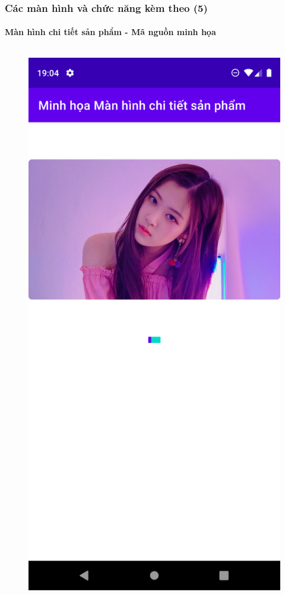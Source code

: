 \documentclass{beamer}
\begin{document}
\begin{frame}
    \frametitle{Các màn hình và chức năng kèm theo (5)}
    \framesubtitle{Màn hình chi tiết sản phẩm - Mã nguồn minh họa}

    \begin{columns}
        \begin{figure}
            \centering
            \includegraphics[height=0.7\textheight]{images/30.png}

\end{figure}
\end{columns}
\end{frame}
\end{document}
